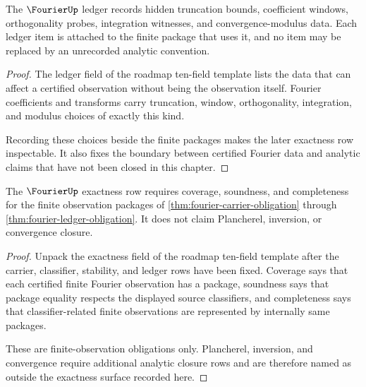 \begin{theorem}\label{thm:fourier-ledger-obligation}
The $\FourierUp$ ledger records hidden truncation bounds, coefficient windows, orthogonality probes, integration witnesses, and convergence-modulus data. Each ledger item is attached to the finite package that uses it, and no item may be replaced by an unrecorded analytic convention.
\end{theorem}
\begin{proof}
The ledger field of the roadmap ten-field template lists the data that can affect a certified observation without being the observation itself. Fourier coefficients and transforms carry truncation, window, orthogonality, integration, and modulus choices of exactly this kind.

Recording these choices beside the finite packages makes the later exactness row inspectable. It also fixes the boundary between certified Fourier data and analytic claims that have not been closed in this chapter.
\end{proof}

\begin{theorem}\label{thm:fourier-exactness-obligation}
The $\FourierUp$ exactness row requires coverage, soundness, and completeness for the finite observation packages of \autoref{thm:fourier-carrier-obligation} through \autoref{thm:fourier-ledger-obligation}. It does not claim Plancherel, inversion, or convergence closure.
\end{theorem}
\begin{proof}
Unpack the exactness field of the roadmap ten-field template after the carrier, classifier, stability, and ledger rows have been fixed. Coverage says that each certified finite Fourier observation has a package, soundness says that package equality respects the displayed source classifiers, and completeness says that classifier-related finite observations are represented by internally same packages.

These are finite-observation obligations only. Plancherel, inversion, and convergence require additional analytic closure rows and are therefore named as outside the exactness surface recorded here.
\end{proof}

